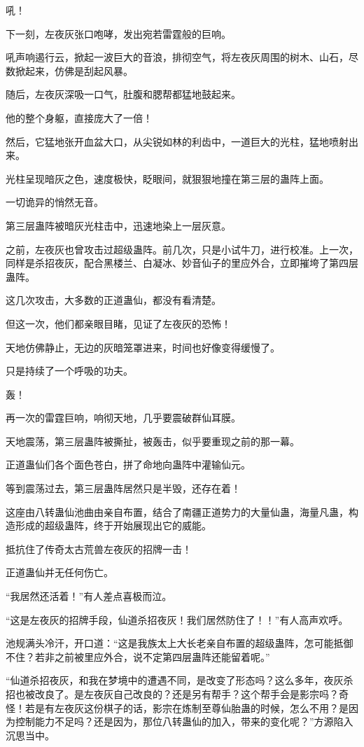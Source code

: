 \begin{this_body}
吼！

下一刻，左夜灰张口咆哮，发出宛若雷霆般的巨响。

吼声响遏行云，掀起一波巨大的音浪，排彻空气，将左夜灰周围的树木、山石，尽数掀起来，仿佛是刮起风暴。

随后，左夜灰深吸一口气，肚腹和腮帮都猛地鼓起来。

他的整个身躯，直接庞大了一倍！

然后，它猛地张开血盆大口，从尖锐如林的利齿中，一道巨大的光柱，猛地喷射出来。

光柱呈现暗灰之色，速度极快，眨眼间，就狠狠地撞在第三层的蛊阵上面。

一切诡异的悄然无音。

第三层蛊阵被暗灰光柱击中，迅速地染上一层灰意。

之前，左夜灰也曾攻击过超级蛊阵。前几次，只是小试牛刀，进行校准。上一次，同样是杀招夜灰，配合黑楼兰、白凝冰、妙音仙子的里应外合，立即摧垮了第四层蛊阵。

这几次攻击，大多数的正道蛊仙，都没有看清楚。

但这一次，他们都亲眼目睹，见证了左夜灰的恐怖！

天地仿佛静止，无边的灰暗笼罩进来，时间也好像变得缓慢了。

只是持续了一个呼吸的功夫。

轰！

再一次的雷霆巨响，响彻天地，几乎要震破群仙耳膜。

天地震荡，第三层蛊阵被撕扯，被轰击，似乎要重现之前的那一幕。

正道蛊仙们各个面色苍白，拼了命地向蛊阵中灌输仙元。

等到震荡过去，第三层蛊阵居然只是半毁，还存在着！

这座由八转蛊仙池曲由亲自布置，结合了南疆正道势力的大量仙蛊，海量凡蛊，构造形成的超级蛊阵，终于开始展现出它的威能。

抵抗住了传奇太古荒兽左夜灰的招牌一击！

正道蛊仙并无任何伤亡。

“我居然还活着！”有人差点喜极而泣。

“这是左夜灰的招牌手段，仙道杀招夜灰！我们居然防住了！！”有人高声欢呼。

池规满头冷汗，开口道：“这是我族太上大长老亲自布置的超级蛊阵，怎可能抵御不住？若非之前被里应外合，说不定第四层蛊阵还能留着呢。”

“仙道杀招夜灰，和我在梦境中的遭遇不同，是改变了形态吗？这么多年，夜灰杀招也被改良了。是左夜灰自己改良的？还是另有帮手？这个帮手会是影宗吗？奇怪！若是有左夜灰这份棋子的话，影宗在炼制至尊仙胎蛊的时候，怎么不用？是因为控制能力不足吗？还是因为，那位八转蛊仙的加入，带来的变化呢？”方源陷入沉思当中。


\end{this_body}
